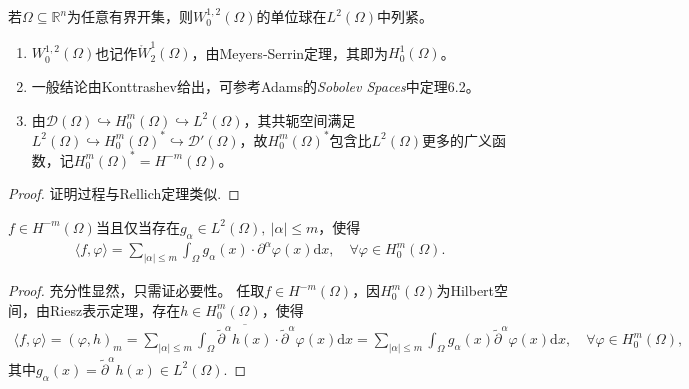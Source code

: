 \documentclass[../../main.tex]{subfiles}%
\begin{document}
\begin{corollary}
若$\Omega\subseteq\mathbb{R}^{n}$为任意有界开集，则$W_{0}^{1,2}(\Omega)$的单位球在$L^{2}(\Omega)$中列紧。
\end{corollary}
\begin{remark}
\begin{enumerate}[(1)]
\item $W_{0}^{1,2}(\Omega)$也记作$\mathring{W}_{2}^{1}(\Omega)$，由Meyers‑Serrin定理，其即为$H_{0}^{1}(\Omega)$。

\item 一般结论由Konttrashev给出，可参考Adams的\textit{Sobolev Spaces}中定理6.2。

\item 由$\mathscr{D}(\Omega)\hookrightarrow H_{0}^{m}(\Omega)\hookrightarrow L^{2}(\Omega)$，其共轭空间满足$L^{2}(\Omega)\hookrightarrow H_{0}^{m}(\Omega)^{*}\hookrightarrow\mathscr{D}'(\Omega)$，故$H_{0}^{m}(\Omega)^{*}$包含比$L^{2}(\Omega)$更多的广义函数，记$H_{0}^{m}(\Omega)^{*}=H^{-m}(\Omega)$。
\end{enumerate}
\end{remark}
\begin{proof}
证明过程与Rellich定理类似.
\end{proof}



\begin{theorem}
$f\in H^{-m}(\Omega)$当且仅当存在$g_{\alpha}\in L^{2}(\Omega),\ |\alpha|\leqslant m$，使得
\begin{align*}
\langle f,\varphi\rangle=\sum\limits_{|\alpha|\leqslant m}\int_{\Omega}g_{\alpha}(x)\cdot\partial^{\alpha}\varphi(x)\mathrm{d}x,\quad \forall\varphi\in H_{0}^{m}(\Omega).
\end{align*}
\end{theorem}

\begin{proof}
充分性显然，只需证必要性。
任取$f\in H^{-m}(\Omega)$，因$H_{0}^{m}(\Omega)$为Hilbert空间，由Riesz表示定理，存在$h\in H_{0}^{m}(\Omega)$，使得
\begin{align}
\langle f,\varphi\rangle=(\varphi,h)_{m}=\sum\limits_{|\alpha|\leqslant m}\int_{\Omega}\overline{\widetilde{\partial}^{\alpha}h(x)}\cdot\widetilde{\partial}^{\alpha}\varphi(x)\mathrm{d}x=\sum\limits_{|\alpha|\leqslant m}\int_{\Omega}g_{\alpha}(x)\widetilde{\partial}^{\alpha}\varphi(x)\mathrm{d}x,\quad \forall\varphi\in H_{0}^{m}(\Omega),\label{eq:riesz111}
\end{align}
其中$g_{\alpha}(x)=\widetilde{\partial}^{\alpha}h(x)\in L^{2}(\Omega)$.
\end{proof}
\end{document}

